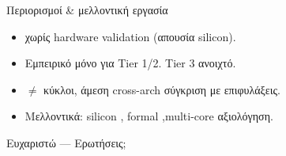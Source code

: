 \begin{frame}{Περιορισμοί \& μελλοντική εργασία}
  \begin{itemize}
    \item {} χωρίς hardware validation (απουσία \Zvbc silicon).
    \item Εμπειρικό  μόνο για Tier 1/2. Tier 3  ανοιχτό.
    \item \instret $\neq$ κύκλοι, άμεση cross-arch σύγκριση με επιφυλάξεις.
    \item Μελλοντικά: silicon \Zvbc,\ifincludeCT{} formal ,\fi multi-core αξιολόγηση.
  \end{itemize}
  \vspace{0.7em}
  \begin{center}\Large Ευχαριστώ — Ερωτήσεις;\end{center}
\end{frame}
